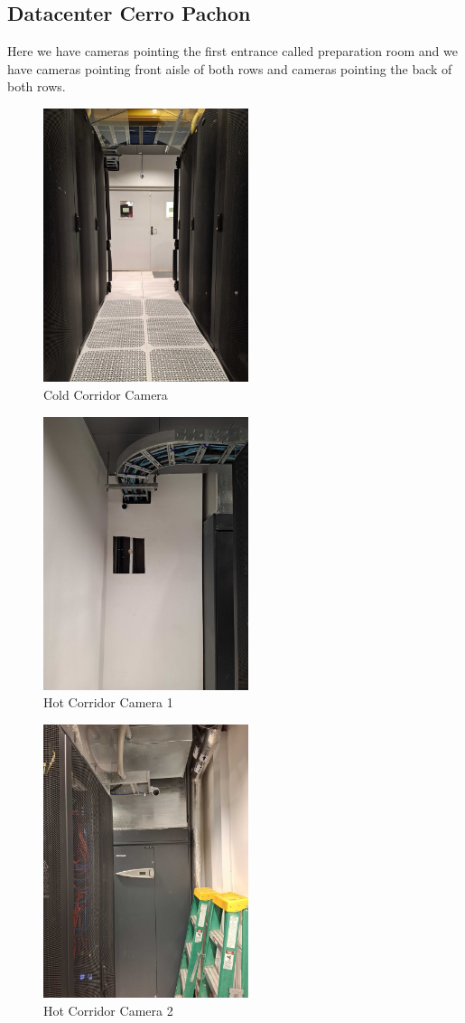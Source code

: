 \subsection{Datacenter Cerro Pachon}

Here we have cameras pointing the first entrance called preparation room and we have cameras pointing front aisle of both rows and cameras pointing the back of both rows.

\begin{figure}
    \includegraphics[width=6cm]{10.jpg}
    \centering
    \caption*{Cold Corridor Camera}
  \end{figure}
  \begin{figure}
    \includegraphics[width=6cm]{11.jpg}
    \centering
    \caption*{Hot Corridor Camera 1}
  \end{figure}
  \begin{figure}
    \includegraphics[width=6cm]{22.jpg}
    \centering
    \caption*{Hot Corridor Camera 2}
  \end{figure}


